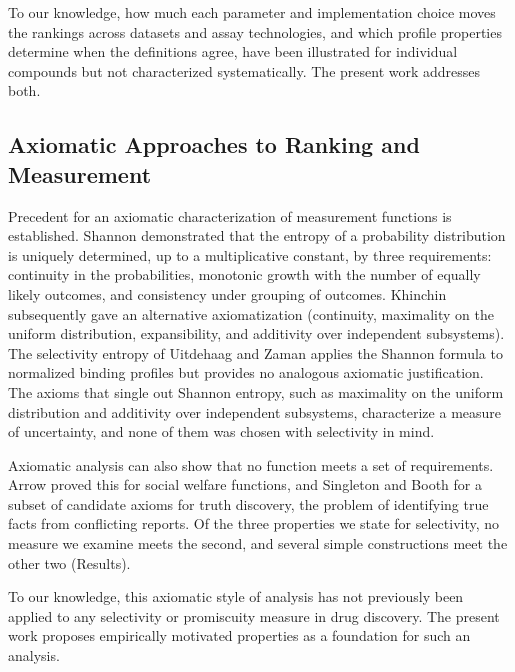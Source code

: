 To our knowledge, how much each parameter and implementation choice moves the
rankings across datasets and assay technologies, and which profile properties
determine when the definitions agree, have been illustrated for individual
compounds but not characterized systematically. The present
work addresses both.

\subsection{Axiomatic Approaches to Ranking and Measurement}
\label{sec:related:axiomatic}

Precedent for an
axiomatic characterization of measurement functions is established.
Shannon\cite{Shannon1948} demonstrated that the entropy of a probability
distribution is uniquely determined, up to a multiplicative constant, by three
requirements: continuity in the probabilities, monotonic growth with the
number of equally likely outcomes, and consistency under grouping of outcomes.
Khinchin\cite{Khinchin1957} subsequently gave an alternative axiomatization
(continuity, maximality on the uniform distribution, expansibility, and
additivity over independent subsystems).
The selectivity entropy of Uitdehaag and Zaman applies the Shannon formula to
normalized binding profiles but provides no analogous axiomatic justification.
The axioms that single out Shannon entropy, such as maximality on the uniform
distribution and additivity over independent subsystems, characterize a measure
of uncertainty, and none of them was chosen with selectivity in mind.

Axiomatic analysis can also show that no function meets a set of
requirements. Arrow\cite{Arrow1951} proved this for social welfare functions,
and Singleton and Booth\cite{Singleton2022} for a subset of candidate axioms
for truth discovery, the problem of identifying true facts from conflicting
reports. Of the three properties we state for selectivity, no measure we
examine meets the second, and several simple constructions meet the other two
(Results).

To our knowledge, this axiomatic style of analysis has not previously been
applied to any selectivity or promiscuity measure in drug discovery.
The present work proposes empirically motivated properties as a
foundation for such an analysis.
